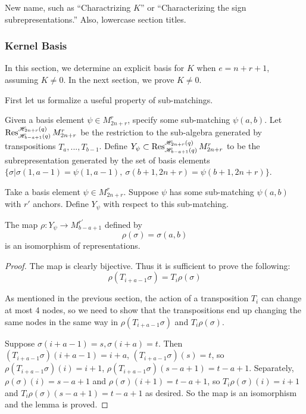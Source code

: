 \documentclass{amsart}
\begin{document}
{\color{magenta} New name, such as ``Charactrizing $K$'' or ``Characterizing the sign subrepresentations.''
Also, lowercase section titles.}
\subsubsection{Kernel Basis}

In this section, we determine an explicit basis for $K$ when $e=n+r+1$, assuming $K\not=0$. In the next section, we prove $K\not=0$.

First let us formalize a useful property of sub-matchings.

\begin{definition}
	Given a basis element $\psi\in M_{2n+r}^r$, specify some sub-matching $\psi(a,b)$. Let $\operatorname{Res}_{\mathscr{H}_{b-a+1}(q)}^{\mathscr{H}_{2n+r}(q)}M_{2n+r}^r$ be the restriction to the sub-algebra generated by transpositions $T_a,...,T_{b-1}$. Define $Y_\psi\subset\operatorname{Res}_{\mathscr{H}_{b-a+1}(q)}^{\mathscr{H}_{2n+r}(q)}M_{2n+r}^r$ to be the subrepresentation generated by the set of basis elements $\{\sigma| \sigma(1,a-1)=\psi(1,a-1),\ \sigma(b+1,2n+r)=\psi(b+1,2n+r)\}$.
\end{definition}

\begin{lemma}
	Take a basis element $\psi\in M_{2n+r}^r$. Suppose $\psi$ has some sub-matching $\psi(a,b)$ with $r'$ anchors. Define $Y_\psi$ with respect to this sub-matching.
	
	The map $\rho:Y_\psi\rightarrow M_{b-a+1}^{r'}$ defined by $$\rho(\sigma)=\sigma(a,b)$$ is an isomorphism of representations.
	
	\label{sub-matching isomorphism}
\end{lemma}

\begin{proof}
	
	The map is clearly bijective. Thus it is sufficient to prove the following: $$\rho(T_{i+a-1}\sigma)=T_i\rho(\sigma)$$
	
	As mentioned in the previous section, the action of a transposition $T_i$ can change at most 4 nodes, so we need to show that the transpositions end up changing the same nodes in the same way in  $\rho(T_{i+a-1}\sigma)$ and $T_i\rho(\sigma)$.
	
	Suppose $\sigma(i+a-1)=s,\sigma(i+a)=t$. Then $(T_{i+a-1}\sigma)(i+a-1)=i+a$, $(T_{i+a-1}\sigma)(s)=t$, so $\rho(T_{i+a-1}\sigma)(i)=i+1$, $\rho(T_{i+a-1}\sigma)(s-a+1)=t-a+1$. Separately, $\rho(\sigma)(i)=s-a+1$ and $\rho(\sigma)(i+1)=t-a+1$, so $T_i\rho(\sigma)(i)=i+1$ and $T_i\rho(\sigma)(s-a+1)=t-a+1$ as desired. So the map is an isomorphism and the lemma is proved.
\end{proof}
\end{document}
